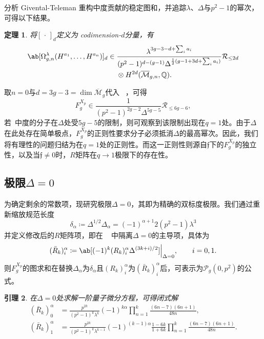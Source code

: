 \documentclass{amsart}
\newtheorem{thm}{定理}[section]
\newtheorem{lem}[thm]{引理}
\theoremstyle{definition}
\theoremstyle{remark}
\theoremstyle{plain}
\theoremstyle{definition}
\theoremstyle{remark}
\newcommand{\Q}{\mathbb{Q}}
\newcommand{\Mbar}{\overline{\mathcal{M}}}
\newcommand{\mc}[1]{\mathcal{#1}}
\newcommand{\mf}[1]{\mathfrak{#1}}
\newcommand{\1}{\mathbf{1}}
\newcommand{\2}{\mathbf{2}}
\newcommand{\3}{\mathbf{3}}
\begin{document}
分析 Givental-Teleman 重构中度贡献的稳定图和，并追踪\(\lambda\)、\(\Delta\)与\(p^2-1\)的幂次，可得以下结果。

\begin{thm}%
\label{thm:local P1 reconstruction}
将\([\,\cdot\,]_d\)定义为 codimension-\(d\)分量，有
    \begin{align*}
        \ab[\Omega^{\lambda}_{g,n}(H^{a_1},\ldots,H^{a_n})]_d \in{}& \frac{\lambda^{3g-3-d+\sum_i a_i}}{(p^2-1)^{d-(g-1)}\Delta^{\frac{1}{2}(g-1+3d+\sum_i a_i)}}\mc{R}_{\leq 2d} \\
        &\otimes H^{2d}(\Mbar_{g,n},\Q).
    \end{align*}
\end{thm}

取\(n=0\)与\(d = 3g-3 = \dim \Mbar_g\)代入 ~，可得
\[ F_g^{X_p} \in \frac{1}{(p^2-1)^{2g-2}\Delta^{5g-5}}\mc{R}_{\leq 6g-6}, \]
若~中度的分子在\(\Delta\)处受\(5g-5\)的限制，则可观察到该限制出现在\(q=1\)处。由于\(\Delta\)在此处存在简单极点，\(F_g^{X_p}\)的正则性要求分子必须抵消\(\Delta\)的最高幂次。因此，我们将有理性的问题归结为在\(q=1\)处的正则性。而这一正则性则源自\(\mf{f}\)下的\(F_g^{X_p}\)的独立性，以及当\(\mf{f} \neq 0\)时，\(R\)矩阵在\(q \to 1\)极限下的存在性。

\subsection{极限\(\Delta = 0\)}%
\label{sub:The limit Delta = 0}

为确定剩余的常数项，现研究极限\(\Delta = 0\)，其即为精确的双标度极限。我们通过重新缩放规范长度
\[ \delta_{\alpha} \coloneqq \Delta^{1/2}\Delta_{\alpha} = (-1)^{\alpha+1}2(p^2-1)\lambda^3 \]
并定义修改后的\(R\)矩阵项，即在 ~ 中隔离\(\Delta = 0\)的主导项，具体为
\[ (\bar{R}_k)_i^{\alpha} \coloneqq \ab[(-1)^k (R_k)_i^{\alpha}\Delta^{(3k+i)/2}]\Big|_{\Delta=0}, \qquad i = 0,1. \]
则\(F_g^{X_p}\)的图求和在替换\(\Delta_{\alpha}\)为\(\delta_{\alpha}\)且\((R_k)_i^{\alpha}\)为\((\bar{R}_k)_i^{\alpha}\)后，可表示为\(\mc{P}_g(0,p^2)\)的公式。

\begin{lem}%
\label{lem:R matrix at Delta zero}
在\(\Delta = 0\)处求解一阶量子微分方程，可得闭式解
    \begin{align*}
        (\bar{R}_k)_0^{\alpha} &= \frac{p^{2k}}{(p^2-1)^k\lambda^k}(-1)^{k\alpha}\prod_{n=1}^k \frac{(6n-7)(6n+1)}{48n}, \\
        (\bar{R}_k)_1^{\alpha} &= \frac{p^{2k}}{(p^2-1)^k \lambda^{k-1}}(-1)^{(k-1)\alpha}\frac{1-6k}{1+6k}\prod_{n=1}^k \frac{(6n-7)(6n+1)}{48n}.
    \end{align*}
\end{lem}
\end{document}
